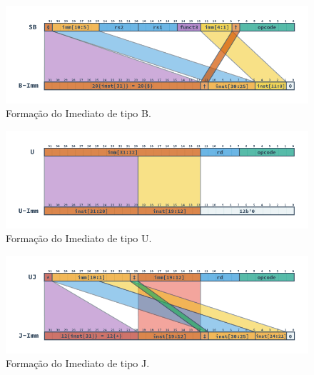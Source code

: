         \begin{figure}[H]
        \centering
            \includegraphics[width=1\linewidth]{images/RV_B_Imm.png}
            \caption{Formação do Imediato de tipo B.}\label{fig:riscv_b_imm}
        \end{figure}

        \begin{figure}[H]
        \centering
            \includegraphics[width=1\linewidth]{images/RV_U_Imm.png}
            \caption{Formação do Imediato de tipo U.}\label{fig:riscv_u_imm}
        \end{figure}

        \begin{figure}[H]
        \centering
            \includegraphics[width=1\linewidth]{images/RV_J_Imm.png}
            \caption{Formação do Imediato de tipo J.}\label{fig:riscv_j_imm}
        \end{figure}


